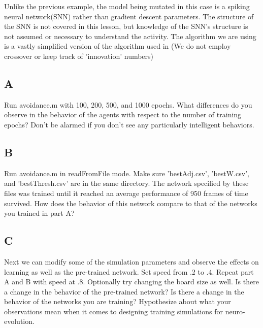 \documentclass[12]{extarticle}
\begin{document}
Unlike the previous example, the model being mutated in this case is a spiking neural network(SNN) rather than gradient descent parameters. The structure of the SNN is not covered in this lesson, but knowledge of the SNN's structure is not assumed or necessary to understand the activity. The algorithm we are using is a vastly simplified version of the algorithm used in \cite{Stanley}(We do not employ crossover or keep track of 'innovation' numbers)
\subsection{A}
Run avoidance.m with 100, 200, 500, and 1000 epochs.  What differences do you observe in the behavior of the agents with respect to the number of training epochs? Don't be alarmed if you don't see any particularly intelligent behaviors.
\subsection{B}
Run avoidance.m in readFromFile mode. Make sure 'bestAdj.csv', 'bestW.csv', and 'bestThresh.csv' are in the same directory. The network specified by these files was trained until it reached an average performance of 950 frames of time survived. How does the behavior of this network compare to that of the networks you trained in part A?

\subsection{C}
Next we can modify some of the simulation parameters and observe the effects on learning as well as the pre-trained network. Set speed from .2 to .4. Repeat part A and B with speed at .8. Optionally try changing the board size as well. Is there a change in the behavior of the pre-trained network? Is there a change in the behavior of the networks you are training? Hypothesize about what your observations mean when it comes to designing training simulations for neuro-evolution.

  


{}

\end{document}
